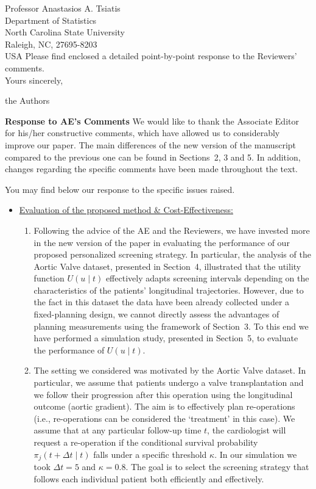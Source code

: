 \documentclass[a4paper, 11pt]{letter}
\begin{document}
\begin{letter}{Professor Anastasios A. Tsiatis\\
Department of Statistics\\
North Carolina State University\\
Raleigh, NC, 27695-8203\\
USA}
Please find enclosed a detailed point-by-point response to the
Reviewers' comments.\\

Yours sincerely,

the Authors


\newpage
\textbf{Response to AE's Comments}
\newline \newline
We would like to thank the Associate Editor for his/her constructive comments, which have allowed us to considerably improve our paper. The main differences of the new version of the manuscript compared to the previous one can be found in Sections~2, 3 and 5. In addition, changes regarding the specific comments have been made throughout the text.

You may find below our response to the specific issues raised.

\begin{itemize} \itemsep=22pt
\item \underline{Evaluation of the proposed method \& Cost-Effectiveness:}
    \begin{enumerate}
    \item Following the advice of the AE and the Reviewers, we have invested more in the new version of the paper in evaluating the performance of our proposed personalized screening strategy. In particular, the analysis of the Aortic Valve dataset, presented in Section~4, illustrated that the utility function $U(u \mid t)$ effectively adapts screening intervals depending on the characteristics of the patients' longitudinal trajectories. However, due to the fact in this dataset the data have been already collected under a fixed-planning design, we cannot directly assess the advantages of planning measurements using the framework of Section~3. To this end we have performed a simulation study, presented in Section~5, to evaluate the performance of $U(u \mid t)$.

    \item The setting we considered was motivated by the Aortic Valve dataset. In particular, we assume that patients undergo a valve transplantation and we follow their progression after this operation using the longitudinal outcome (aortic gradient). The aim is to effectively plan re-operations (i.e., re-operations can be considered the `treatment' in this case). We assume that at any particular follow-up time $t$, the cardiologist will request a re-operation if the conditional survival probability $\pi_j(t + \Delta t \mid t)$ falls under a specific threshold $\kappa$. In our simulation we took $\Delta t = 5$ and $\kappa = 0.8$. The goal is to select the screening strategy that follows each individual patient both efficiently and effectively.


\end{enumerate}
\end{itemize}
\end{letter}
\end{document}
